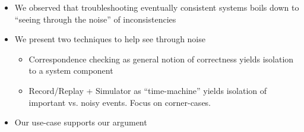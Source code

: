 \begin{itemize}
\item We observed that troubleshooting eventually consistent systems boils down to
``seeing through the noise'' of inconsistencies
\item We present two techniques to help see through noise
    \begin{itemize}
    \item Correspondence checking as general notion of correctness yields isolation to a
    system component
    \item Record/Replay + Simulator as ``time-machine'' yields isolation of important vs.
    noisy events. Focus on corner-cases.
    \end{itemize}
\item Our use-case supports our argument
\end{itemize}
